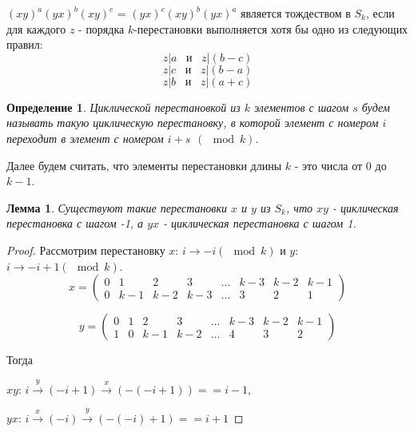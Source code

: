 \documentclass[12pt]{article}
\newtheorem{lemma}{Лемма}
\newtheorem{definition}{Определение}
\begin{document}
		$(xy)^a(yx)^b(xy)^c$ = $(yx)^c(xy)^b(yx)^a$ является тождеством в $S_k$, если для каждого $z$ - порядка $k$-перестановки выполняется хотя бы одно из следующих правил:
		\begin{equation} \label{3blocks 1st cond}
		z|a \hspace{10pt} \text{и} \hspace{10pt} z|(b-c)
		\end{equation}
		\begin{equation}
		z|c \hspace{10pt} \text{и} \hspace{10pt} z|(b-a)
		\end{equation}
		\begin{equation} \label{3blocks 3rd cond}
		z|b \hspace{10pt} \text{и} \hspace{10pt} z|(a+c)
		\end{equation}
	
	\begin{definition}
		Циклической перестановкой из $k$ элементов с шагом $s$ будем называть такую циклическую перестановку, в которой элемент с номером $i$ переходит в элемент с номером $i+s \hspace{5pt} (\mod k)$. 
	\end{definition}
	
	Далее будем считать, что элементы перестановки длины $k$ - это числа от $0$ до $k-1$.
	
	\begin{lemma} \label{existence_of_clockwise_and_vv}
		Существуют такие перестановки $x$ и $y$ из $S_k$, что $xy$ - циклическая перестановка с шагом -1, а $yx$ - циклическая перестановка с шагом 1.
	\end{lemma}
	\begin{proof}
		Рассмотрим перестановку $x$: $i \rightarrow -i (\mod k)$ и $y$: $i \rightarrow -i+1 (\mod k)$.
		$$
		x = 
		\begin{pmatrix}
		0&1&2&3&...&k-3&k-2&k-1\\
		0&k-1&k-2&k-3&...&3&2&1
		\end{pmatrix}
		$$
		
		$$
		y = 
		\begin{pmatrix}
		0&1&2&3&...&k-3&k-2&k-1\\
		1&0&k-1&k-2&...&4&3&2
		\end{pmatrix}
		$$
		
		Тогда 
		
		$xy$: $i \xrightarrow y (-i+1) \xrightarrow x (-(-i+1)) == i-1$,
		
		$yx$: $i \xrightarrow x (-i) \xrightarrow y (-(-i)+1) == i+1$
		
	\end{proof}
	
\end{document}
